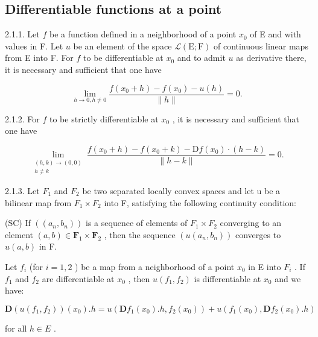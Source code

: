 \subsection{Differentiable functions at a point}

2.1.1. Let \(f\) be a function defined in a neighborhood of a point \(x_{0}\) of E and with values in F. Let \(u\) be an element of the space \(\mathcal{L}(\mathrm{E};\mathrm{F})\) of continuous linear maps from E into F. For \(f\) to be differentiable at \(x_{0}\) and to admit \(u\) as derivative there, it is necessary and sufficient that one have

\[
\lim _ {h \rightarrow 0, h \neq 0} \frac {f (x _ {0} + h) - f (x _ {0}) - u (h)}{\| h \|} = 0.
\]

2.1.2. For \(f\) to be strictly differentiable at \(x_{0}\) , it is necessary and sufficient that one have

\[
\lim_{\substack{(h,k)\to (0,0)\\ h\neq k}}\frac{f(x_{0} + h) - f(x_{0} + k) - \mathrm{D}f(x_{0})\cdot(h - k)}{\|h - k\|} = 0.
\]

2.1.3. Let \(F_{1}\) and \(F_{2}\) be two separated locally convex spaces and let u be a bilinear map from \(F_{1} \times F_{2}\) into F, satisfying the following continuity condition:

(SC) If \(((a_{n}, b_{n}))\) is a sequence of elements of \(F_{1} \times F_{2}\) converging to an element \((a, b) \in \mathbf{F}_{1} \times \mathbf{F}_{2}\) , then the sequence \((u(a_{n}, b_{n}))\) converges to \(u(a, b)\) in F.

Let \(f_{i}\) (for \(i = 1, 2\) ) be a map from a neighborhood of a point \(x_{0}\) in E into \(F_{i}\) . If \(f_{1}\) and \(f_{2}\) are differentiable at \(x_{0}\) , then \(u(f_{1}, f_{2})\) is differentiable at \(x_{0}\) and we have:

\[
\mathbf {D} (u (f _ {1}, f _ {2})) (x _ {0}). h = u (\mathbf {D} f _ {1} (x _ {0}). h, f _ {2} (x _ {0})) + u (f _ {1} (x _ {0}), \mathbf {D} f _ {2} (x _ {0}). h)
\]

for all \(h \in E\) .

